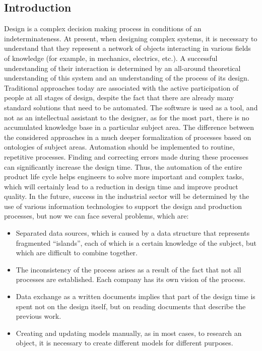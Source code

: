 \documentclass[8pt,twocolumn]{article}
\begin{document}
\begin{center}
\section{Introduction}
Design is a complex decision making process in conditions
of an indeterminateness. At present, when designing complex
systems, it is necessary to understand that they represent a
network of objects interacting in various fields of knowledge
(for example, in mechanics, electrics, etc.). A successful understanding of their interaction is determined by an all-around
theoretical understanding of this system and an understanding
of the process of its design. Traditional approaches today are
associated with the active participation of people at all stages
of design, despite the fact that there are already many standard
solutions that need to be automated. The software is used as
a tool, and not as an intellectual assistant to the designer, as
for the most part, there is no accumulated knowledge base in a
particular subject area. The difference between the considered
approaches in a much deeper formalization of processes based
on ontologies of subject areas. Automation should be implemented to routine, repetitive processes. Finding and correcting
errors made during these processes can significantly increase
the design time. Thus, the automation of the entire product life
cycle helps engineers to solve more important and complex
tasks, which will certainly lead to a reduction in design time and
improve product quality. In the future, success in the industrial
sector will be determined by the use of various information
technologies to support the design and production processes,
but now we can face several problems, which are:
\begin{itemize}
  \item Separated data sources, which is caused by a data structure that represents fragmented “islands”, each of which is a certain knowledge of the subject, but which are difficult to combine together.
  \item The inconsistency of the process arises as a result of the fact that not all processes are established. Each company has its own vision of the process. 
  \item Data exchange as a written documents implies that part of the design time is spent not on the design itself, but on reading documents that describe the previous work.
  \item Creating and updating models manually, as in most cases, to research an object, it is necessary to create different models for different purposes.
\end{itemize}    
\end{center}
\end{document}
